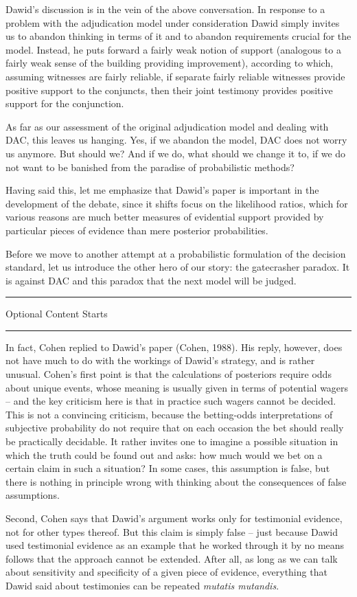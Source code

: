 \documentclass[10pt,dvipsnames,enabledeprecatedfontcommands]{scrartcl}
\newcommand{\intermezzoa}{
	\begin{minipage}[c]{13cm}
	\begin{center}\rule{10cm}{0.4pt}



	\tiny{\sc Optional Content Starts}
	
	\vspace{-1mm}
	
	\rule{10cm}{0.4pt}\end{center}
	\end{minipage}\nopagebreak 
	}
\begin{document}
Dawid's discussion is in the vein of the above conversation. In response
to a problem with the adjudication model under consideration Dawid
simply invites us to abandon thinking in terms of it and to abandon
requirements crucial for the model. Instead, he puts forward a fairly
weak notion of support (analogous to a fairly weak sense of the building
providing improvement), according to which, assuming witnesses are
fairly reliable, if separate fairly reliable witnesses provide positive
support to the conjuncts, then their joint testimony provides positive
support for the conjunction.

As far as our assessment of the original adjudication model and dealing
with DAC, this leaves us hanging. Yes, if we abandon the model, DAC does
not worry us anymore. But should we? And if we do, what should we change
it to, if we do not want to be banished from the paradise of
probabilistic methods?

Having said this, let me emphasize that Dawid's paper is important in
the development of the debate, since it shifts focus on the likelihood
ratios, which for various reasons are much better measures of evidential
support provided by particular pieces of evidence than mere posterior
probabilities.

Before we move to another attempt at a probabilistic formulation of the
decision standard, let us introduce the other hero of our story: the
gatecrasher paradox. It is against DAC and this paradox that the next
model will be judged.

\intermezzoa

In fact, Cohen replied to Dawid's paper (Cohen, 1988). His reply,
however, does not have much to do with the workings of Dawid's strategy,
and is rather unusual. Cohen's first point is that the calculations of
posteriors require odds about unique events, whose meaning is usually
given in terms of potential wagers -- and the key criticism here is that
in practice such wagers cannot be decided. This is not a convincing
criticism, because the betting-odds interpretations of subjective
probability do not require that on each occasion the bet should really
be practically decidable. It rather invites one to imagine a possible
situation in which the truth could be found out and asks: how much would
we bet on a certain claim in such a situation? In some cases, this
assumption is false, but there is nothing in principle wrong with
thinking about the consequences of false assumptions.

Second, Cohen says that Dawid's argument works only for testimonial
evidence, not for other types thereof. But this claim is simply false --
just because Dawid used testimonial evidence as an example that he
worked through it by no means follows that the approach cannot be
extended. After all, as long as we can talk about sensitivity and
specificity of a given piece of evidence, everything that Dawid said
about testimonies can be repeated \emph{mutatis mutandis}.
\end{document}

